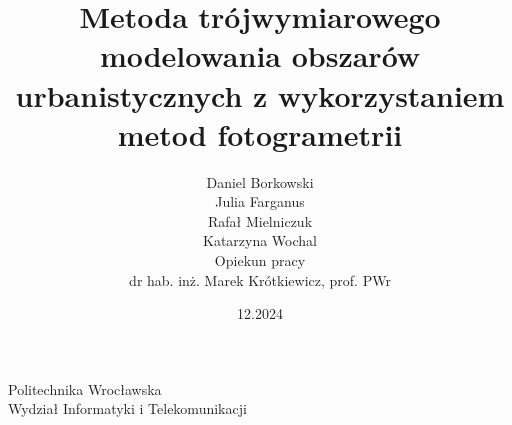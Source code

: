 \documentclass{article}
\title{Metoda trójwymiarowego modelowania obszarów urbanistycznych z wykorzystaniem metod fotogrametrii}
\author{
    Daniel Borkowski\\
    \And
    Julia Farganus\\
    \And
    Rafał Mielniczuk\\
    \And
    Katarzyna Wochal\\
    \And 
    Opiekun pracy\\
    dr hab. inż. Marek Krótkiewicz, prof. PWr \\
}
\date{12.2024}
\begin{document}
\maketitle

\begin{center}
    Politechnika Wrocławska\\
    Wydział Informatyki i Telekomunikacji\\
\end{center}

\vspace{0.5cm}







\end{document}
